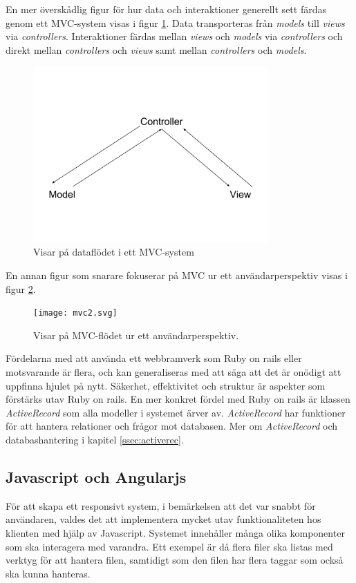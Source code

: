 \documentclass[a4paper,12pt,oneside,final]{extbook}
\begin{document}
En mer överskådlig figur för hur data och interaktioner generellt sett färdas genom ett MVC-system visas i figur \ref{fig:mvc1}. Data transporteras från \textit{models} till \textit{views} via \textit{controllers}. Interaktioner färdas mellan \textit{views} och \textit{models} via \textit{controllers} och direkt mellan \textit{controllers} och \textit{views} samt mellan \textit{controllers} och \textit{models}.

\begin{figure}[!H]
\centering
\includegraphics[width=0.8\textwidth]{figures/mvc1.png}
\caption{Visar på dataflödet i ett MVC-system}
\label{fig:mvc1}
\end{figure}

En annan figur som snarare fokuserar på MVC ur ett användarperspektiv visas i figur \ref{fig:mvc2}.

\begin{figure}[!H]
\centering
\texttt{[image: mvc2.svg]}
\caption{Visar på MVC-flödet ur ett användarperspektiv.}
\label{fig:mvc2}
\end{figure}

Fördelarna med att använda ett webbramverk som Ruby on rails eller motsvarande är flera, och kan generaliseras med att säga att det är onödigt att uppfinna hjulet på nytt. Säkerhet, effektivitet och struktur är aspekter som förstärks utav Ruby on rails. En mer konkret fördel med Ruby on rails är klassen \emph{ActiveRecord} som alla modeller i systemet ärver av. \emph{ActiveRecord} har funktioner för att hantera relationer och frågor mot databasen. Mer om \emph{ActiveRecord} och databashantering i kapitel \ref{ssec:activerec}.

\subsection{Javascript och Angularjs}
För att skapa ett responsivt system, i bemärkelsen att det var snabbt för användaren, valdes det att implementera mycket utav funktionaliteten hos klienten med hjälp av Javascript. Systemet innehåller många olika komponenter som ska interagera med varandra. Ett exempel är då flera filer ska listas med verktyg för att hantera filen, samtidigt som den filen har flera taggar som också ska kunna hanteras. 
\end{document}
